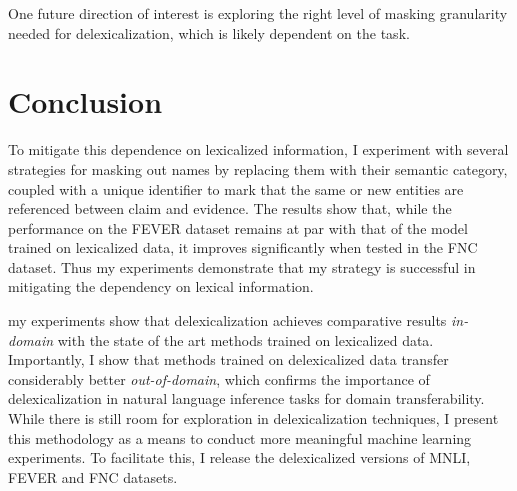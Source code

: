 \documentclass{article}
\begin{document}
One future direction of interest is exploring the right level of masking granularity needed for delexicalization, which is likely dependent on the task. 

\section{Conclusion}
 To mitigate this dependence on lexicalized information, I experiment with several strategies for masking out names by replacing them with their semantic category, coupled with a unique identifier to mark that the same or new entities are referenced between claim and evidence. The results show that, while the performance on the FEVER dataset remains at par with that of the model trained on lexicalized data, it improves significantly when tested in the FNC dataset. Thus my experiments demonstrate that my strategy is successful in mitigating the dependency on lexical information.

my experiments show that delexicalization achieves comparative results {\em in-domain} with the state of the art methods trained on lexicalized data. Importantly, I show that methods trained on delexicalized data transfer considerably better {\em out-of-domain}, which  confirms the importance of delexicalization in natural language inference tasks for domain transferability. While there is still room for exploration in delexicalization techniques, I present this methodology as a means  to conduct more meaningful machine learning experiments. To facilitate this, I release the delexicalized versions of MNLI, FEVER and FNC datasets.





\balance
\begin{spacing}{0.88}


\end{spacing}

\end{document}
